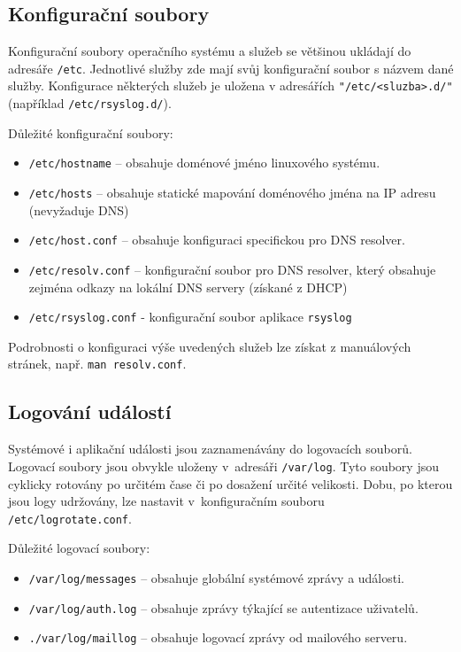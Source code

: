 \subsection{Konfigurační soubory}
Konfigurační soubory operačního systému a služeb se většinou ukládají do adresáře \texttt{/etc}. Jednotlivé služby zde mají svůj konfigurační soubor s názvem dané služby. Konfigurace některých služeb je uložena v adresářích  \texttt{"/etc/<sluzba>.d/"} (například \texttt{/etc/rsyslog.d/}). 

Důležité  konfigurační soubory:
\begin{itemize}
  \item \texttt{/etc/hostname} -- obsahuje doménové jméno linuxového systému.
  \item \texttt{/etc/hosts} -- obsahuje statické mapování doménového jména na IP adresu (nevyžaduje DNS)
  \item \texttt{/etc/host.conf} -- obsahuje konfiguraci specifickou pro DNS resolver.
  \item \texttt{/etc/resolv.conf} -- konfigurační soubor pro DNS resolver, který obsahuje zejména odkazy na lokální DNS servery (získané z DHCP)
  \item \texttt{/etc/rsyslog.conf} - konfigurační soubor aplikace {\tt rsyslog} 
\end{itemize}
Podrobnosti o konfiguraci výše uvedených služeb lze získat z manuálových stránek, např. {\tt man resolv.conf}. 

\subsection{Logování událostí}
Systémové i aplikační události jsou zaznamenávány do logovacích souborů. Logovací soubory jsou obvykle uloženy v~adresáři \texttt{/var/log}. Tyto soubory jsou cyklicky rotovány po určitém čase či po dosažení určité velikosti. Dobu, po kterou jsou logy udržovány, lze nastavit v~konfiguračním souboru\\\texttt{/etc/logrotate.conf}.

Důležité logovací soubory:
\begin{itemize}
  \item \texttt{/var/log/messages} -- obsahuje globální systémové zprávy a události.
  \item \texttt{/var/log/auth.log} -- obsahuje zprávy týkající se autentizace uživatelů.
  \item {\tt ./var/log/maillog} -- obsahuje logovací zprávy od mailového serveru. 
\end{itemize}

